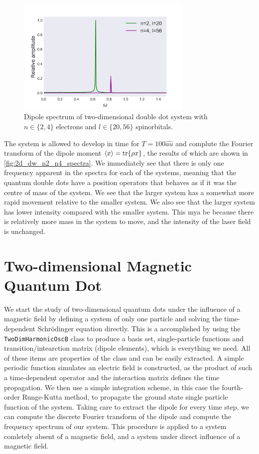 \begin{figure}
    \centering
    \includegraphics[width=0.75\textwidth]{results/figures/DW/dw_n2_n4_spectrum.png} 
    \caption{Dipole spectrum of two-dimensional double dot system with $n\in\{2,4\}$
        electrons and $l\in\{20, 56\}$ spinorbitals. 
    }
    \label{fig:2d_dw_n2_n4_spectra}
\end{figure}

The system is allowed to develop in time for $T = 100 \hat{ au}$ and complute the Fourier 
transform of the dipole moment $\ev{x} = \tr{\rho x}$, the results of which are shown 
in \autoref{fig:2d_dw_n2_n4_spectra}. We immediately see that there is only one frequency 
apparent in the spectra for each of the systems, meaning that the quantum double dots
have a position operators that behaves as if it was the centre of mass of the system. We 
see that the larger system has a somewhat more rapid movement relative to the smaller 
system. We also see that the larger system has lower intensity compared with the smaller 
system. This mya be because there is relatively more mass in the system to move, and the 
intensity of the laser field is unchanged.

\section{Two-dimensional Magnetic Quantum Dot}

We start the study of two-dimensional quantum dots under the influence of a magnetic 
field by defining a system of only one particle and solving the time-dependent 
Schrödinger equation
directly. This is a accomplished by using the \lstinline{TwoDimHarmonicOscB} class
to produce a basis set, single-particle functions and transition/intearction matrix (dipole elements),
which is everything we need. All of these items are properties of the class and can be
easily extracted. A simple periodic function simulates an electric field is constructed, as 
the product of such a time-dependent operator and the interaction matrix defines the 
time propagation. We then use a simple integration scheme, in this case the fourth-order 
Runge-Kutta method, to propagate the ground state single particle function of the system.
Taking care to extract the dipole for every time step, we can compute the discrete Fourier 
transform of the dipole and compute the frequency spectrum of our system. This procedure is 
applied to a system comletely absent of a magnetic field, and a system under direct influence 
of a magnetic field.

